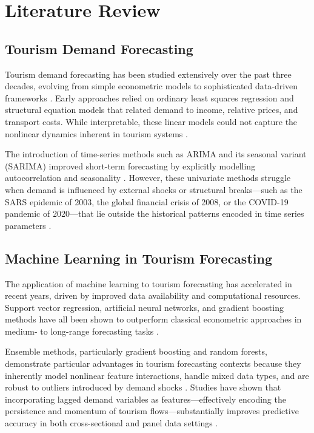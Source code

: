 \documentclass[conference]{IEEEtran}
\begin{document}
\section{Literature Review}

\subsection{Tourism Demand Forecasting}

Tourism demand forecasting has been studied extensively
over the past three decades, evolving from simple
econometric models to sophisticated data-driven frameworks
\cite{song2019}. Early approaches relied on ordinary least
squares regression and structural equation models that related
demand to income, relative prices, and transport costs.
While interpretable, these linear models could not capture
the nonlinear dynamics inherent in tourism systems
\cite{li2018}.

The introduction of time-series methods such as ARIMA and
its seasonal variant (SARIMA) improved short-term
forecasting by explicitly modelling autocorrelation and
seasonality \cite{cankurt2016}. However, these univariate
methods struggle when demand is influenced by external
shocks or structural breaks---such as the SARS epidemic of
2003, the global financial crisis of 2008, or the COVID-19
pandemic of 2020---that lie outside the historical patterns
encoded in time series parameters \cite{pan2022}.

\subsection{Machine Learning in Tourism Forecasting}

The application of machine learning to tourism forecasting
has accelerated in recent years, driven by improved data
availability and computational resources. Support vector
regression, artificial neural networks, and gradient boosting
methods have all been shown to outperform classical
econometric approaches in medium- to long-range forecasting
tasks \cite{sun2019}.

Ensemble methods, particularly gradient boosting and random
forests, demonstrate particular advantages in tourism
forecasting contexts because they inherently model
nonlinear feature interactions, handle mixed data types, and
are robust to outliers introduced by demand shocks
\cite{chen2016}. Studies have shown that incorporating
lagged demand variables as features---effectively encoding
the persistence and momentum of tourism flows---substantially
improves predictive accuracy in both cross-sectional and
panel data settings \cite{gunter2016}.
\end{document}
